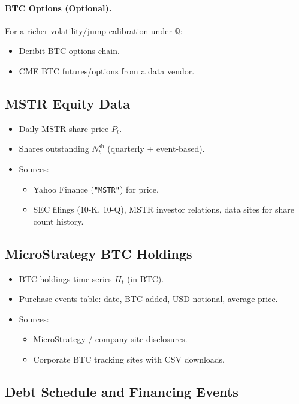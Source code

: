 \documentclass[11pt]{article}
\begin{document}
\paragraph{BTC Options (Optional).}
For a richer volatility/jump calibration under $\mathbb Q$:
\begin{itemize}
  \item Deribit BTC options chain.
  \item CME BTC futures/options from a data vendor.
\end{itemize}

\subsection{MSTR Equity Data}

\begin{itemize}
  \item Daily MSTR share price $P_t$.
  \item Shares outstanding $N_t^{\text{sh}}$ (quarterly + event-based).
  \item Sources:
  \begin{itemize}
    \item Yahoo Finance (\texttt{"MSTR"}) for price.
    \item SEC filings (10-K, 10-Q), MSTR investor relations, data sites for share count history.
  \end{itemize}
\end{itemize}

\subsection{MicroStrategy BTC Holdings}

\begin{itemize}
  \item BTC holdings time series $H_t$ (in BTC).
  \item Purchase events table: date, BTC added, USD notional, average price.
  \item Sources:
  \begin{itemize}
    \item MicroStrategy / company site disclosures.
    \item Corporate BTC tracking sites with CSV downloads.
  \end{itemize}
\end{itemize}

\subsection{Debt Schedule and Financing Events}
\end{document}
